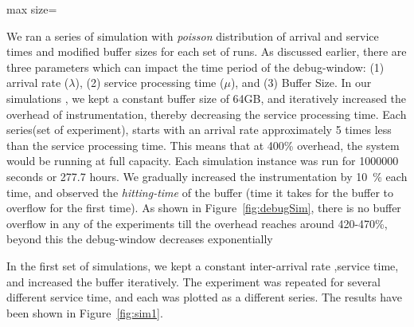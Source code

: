 \begin{figure*}[ht]
\begin{adjustbox}{max size={\textwidth}}
	\end{adjustbox}
	\captionsetup{justification=centering}
	\caption{Simulation results for debug-window sizes with gradually increasing the overhead in service processing times. The buffer is kept at a constant 64GB.}
	\label{fig:debugSim}
\end{figure*}



We ran a series of simulation with \textit{poisson} distribution of arrival and service times and modified buffer sizes for each set of runs.
As discussed earlier, there are three parameters which can impact the time period of the debug-window: (1) arrival rate ($\lambda$), (2) service processing time ($\mu$), and (3) Buffer Size.
In our simulations , we kept a constant buffer size of 64GB, and iteratively increased the overhead of instrumentation, thereby decreasing the service processing time.
Each series(set of experiment), starts with an arrival rate approximately 5 times less than the service processing time. 
This means that at 400\% overhead, the system would be running at full capacity.
Each simulation instance was run for 1000000 seconds or 277.7 hours.
We gradually increased the instrumentation by 10~\% each time, and observed the \textit{hitting-time} of the buffer (time it takes for the buffer to overflow for the first time).
As shown in Figure~\ref{fig:debugSim}, there is no buffer overflow in any of the experiments till the overhead reaches around 420-470\%, beyond this the debug-window decreases exponentially

In the first set of simulations, we kept a constant inter-arrival rate ,service time, and increased the buffer iteratively. 
The experiment was repeated for several different service time, and each was plotted as a different series.
The results have been shown in Figure~\ref{fig:sim1}.

